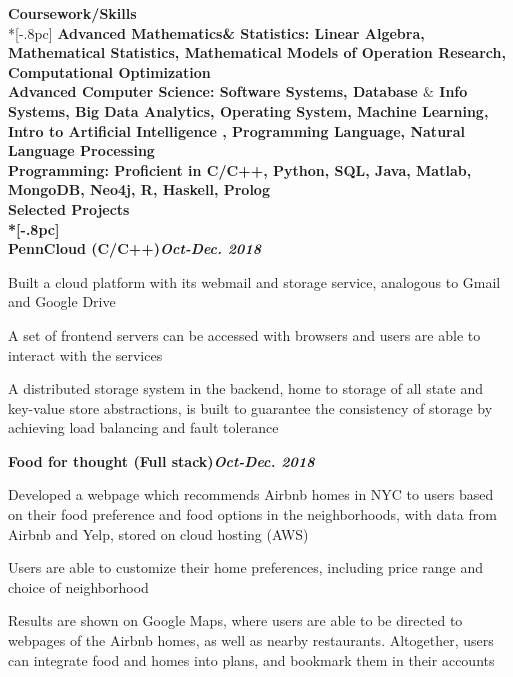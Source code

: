 {\large \bf Coursework/Skills} \\*[-.8pc]
\underline{\hspace{6in}} 
\bf Advanced Mathematics\& Statistics: \rm  Linear Algebra, Mathematical Statistics, Mathematical Models of Operation Research, Computational Optimization\\
\bf Advanced Computer Science: \rm  Software Systems, Database $\&$ Info Systems, Big Data Analytics, Operating System, Machine Learning, Intro to Artificial Intelligence , Programming Language, Natural Language Processing\\
\bf Programming: \rm Proficient in C/C++, Python, SQL, Java, Matlab,  MongoDB, Neo4j, R, Haskell, Prolog\\

{\large \bf Selected Projects} \\*[-.8pc]
\underline{\hspace{6in}} \\
\bf PennCloud (C/C++)\hfill{\it Oct-Dec. 2018}\rm\\
\vspace{-4mm}
\begin{list2}
\item Built a cloud platform with its webmail and storage service, analogous to Gmail and Google Drive
\item A set of frontend servers can be accessed with browsers and users are able to interact with the services
\item  A distributed storage system in the backend, home to storage of all state and key-value store abstractions, is built to guarantee the consistency of storage by achieving load balancing and fault tolerance
\end{list2}

\bf  Food for thought (Full stack)\hfill{\it Oct-Dec. 2018}\rm\\
\vspace{-4mm}
\begin{list2}
\item Developed a webpage which recommends Airbnb homes in NYC to users based on their food 
preference and food options in the neighborhoods, with data from Airbnb and Yelp, stored on cloud hosting (AWS) 
\item Users are able to customize their home preferences, including price range and choice of neighborhood 
\item Results are shown on Google Maps, where users are able to be directed to webpages of  the Airbnb homes, as well as nearby restaurants. Altogether, users can integrate food and homes into plans,  and bookmark them in their accounts
\end{list2}

